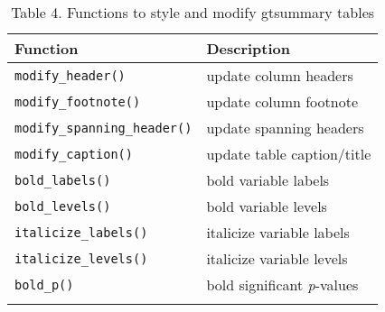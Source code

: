 \captionsetup[table]{labelformat=empty,skip=1pt}
\begin{longtable}{ll}
\toprule
Function & Description \\ 
\midrule
\texttt{modify\_header()} & update column headers \\ 
\texttt{modify\_footnote()} & update column footnote \\ 
\texttt{modify\_spanning\_header()} & update spanning headers \\ 
\texttt{modify\_caption()} & update table caption/title \\ 
\texttt{bold\_labels()} & bold variable labels \\ 
\texttt{bold\_levels()} & bold variable levels \\ 
\texttt{italicize\_labels()} & italicize variable labels \\ 
\texttt{italicize\_levels()} & italicize variable levels \\ 
\texttt{bold\_p()} & bold significant \emph{p}-values \\ 
\bottomrule\caption{\label{tab:caption}Table 4. Functions to style and modify gtsummary tables}\\

\end{longtable}


